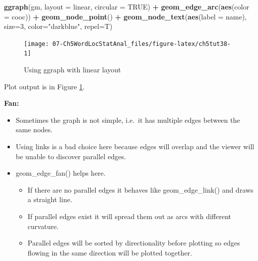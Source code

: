 \documentclass[
]{article}
\newenvironment{Shaded}{\begin{snugshade}}{\end{snugshade}}
\newcommand{\AttributeTok}[1]{\textcolor[rgb]{0.13,0.29,0.53}{#1}}
\newcommand{\ConstantTok}[1]{\textcolor[rgb]{0.56,0.35,0.01}{#1}}
\newcommand{\DecValTok}[1]{\textcolor[rgb]{0.00,0.00,0.81}{#1}}
\newcommand{\FunctionTok}[1]{\textcolor[rgb]{0.13,0.29,0.53}{\textbf{#1}}}
\newcommand{\NormalTok}[1]{#1}
\newcommand{\SpecialCharTok}[1]{\textcolor[rgb]{0.81,0.36,0.00}{\textbf{#1}}}
\newcommand{\StringTok}[1]{\textcolor[rgb]{0.31,0.60,0.02}{#1}}
\providecommand{\tightlist}{%
  \setlength{\itemsep}{0pt}\setlength{\parskip}{0pt}}
\begin{document}
\begin{Shaded}
\begin{Highlighting}[]
\FunctionTok{ggraph}\NormalTok{(gm, }\AttributeTok{layout =} \StringTok{\textquotesingle{}linear\textquotesingle{}}\NormalTok{,  }\AttributeTok{circular =} \ConstantTok{TRUE}\NormalTok{) }\SpecialCharTok{+} 
     \FunctionTok{geom\_edge\_arc}\NormalTok{(}\FunctionTok{aes}\NormalTok{(}\AttributeTok{color =}\NormalTok{ cooc)) }\SpecialCharTok{+}
     \FunctionTok{geom\_node\_point}\NormalTok{() }\SpecialCharTok{+}
     \FunctionTok{geom\_node\_text}\NormalTok{(}\FunctionTok{aes}\NormalTok{(}\AttributeTok{label =}\NormalTok{ name), }\AttributeTok{size=}\DecValTok{3}\NormalTok{, }\AttributeTok{color=}\StringTok{"darkblue"}\NormalTok{, }
                    \AttributeTok{repel=}\NormalTok{T)}
\end{Highlighting}
\end{Shaded}

\begin{figure}

{\centering \texttt{[image: 07-Ch5WordLocStatAnal\_files/figure-latex/ch5tut38-1]} 

}

\caption{Using ggraph with linear layout}\label{fig:ch5tut38}
\end{figure}

Plot output is in Figure \ref{fig:ch5tut38}.

\textbf{Fan:}

\begin{itemize}
\tightlist
\item
  Sometimes the graph is not simple, i.e.~it has multiple edges between the same nodes.
\item
  Using links is a bad choice here because edges will overlap and the viewer will be unable to discover parallel edges.
\item
  geom\_edge\_fan() helps here.

  \begin{itemize}
  \tightlist
  \item
    If there are no parallel edges it behaves like geom\_edge\_link() and draws a straight line.
  \item
    If parallel edges exist it will spread them out as arcs with different curvature.
  \item
    Parallel edges will be sorted by directionality before plotting so edges flowing in the same direction will be plotted together.
  \end{itemize}
\end{itemize}
\end{document}
